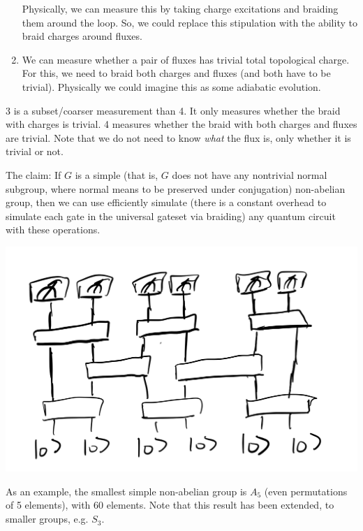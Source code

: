 \begin{enumerate}
\begin{center}
    \end{center}
    Physically, we can measure this by taking charge excitations and braiding them around the loop. So, we could replace this stipulation with the ability to braid charges around fluxes.
    \item We can measure whether a pair of fluxes has trivial total topological charge. For this, we need to braid both charges and fluxes (and both have to be trivial). Physically we could imagine this as some adiabatic evolution.
\end{enumerate}
3 is a subset/coarser measurement than 4. It only measures whether the braid with charges is trivial. 4 measures whether the braid with both charges and fluxes are trivial. Note that we do not need to know \emph{what} the flux is, only whether it is trivial or not.

The claim: If $G$ is a simple (that is, $G$ does not have any nontrivial normal subgroup, where normal means to be preserved under conjugation) non-abelian group, then we can use efficiently simulate (there is a constant overhead to simulate each gate in the universal gateset via braiding) any quantum circuit with these operations.

\begin{center}
    \includegraphics[scale=0.35]{Lectures/Images/lec11-qcircuit.png}
\end{center}

As an example, the smallest simple non-abelian group is $A_5$ (even permutations of 5 elements), with 60 elements. Note that this result has been extended, to smaller groups, e.g. $S_3$.

